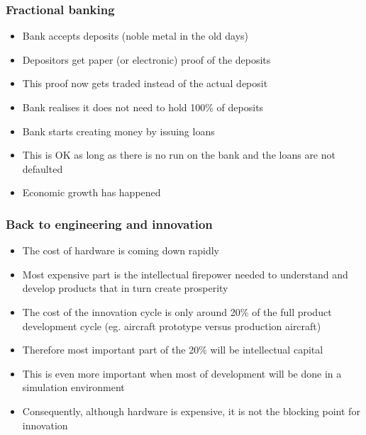\documentclass{beamer}
\begin{document}
\begin{frame}
\frametitle{Fractional banking}

\begin{itemize}
\item Bank accepts deposits (noble metal in the old days)
\item Depositors get paper (or electronic) proof of the deposits
\item This proof now gets traded instead of the actual deposit
\item Bank realises it does not need to hold 100\% of deposits
\item Bank starts creating money by issuing loans
\item This is OK as long as there is no run on the bank and the loans are not defaulted
\item Economic growth has happened
\end{itemize}

\end{frame}

\begin{frame}
\frametitle{Back to engineering and innovation}

\begin{itemize}
\item The cost of hardware is coming down rapidly 
\item Most expensive part is the intellectual firepower needed to understand and develop products that in turn create prosperity
\item The cost of the innovation cycle is only around 20\% of the full product development cycle (eg. aircraft prototype versus production aircraft)
\item Therefore most important part of the 20\% will be intellectual capital
\item This is even more important when most of development will be done in a simulation environment
\item Consequently, although hardware is expensive, it is not the blocking point for innovation
\end{itemize}

\end{frame}
\end{document}
